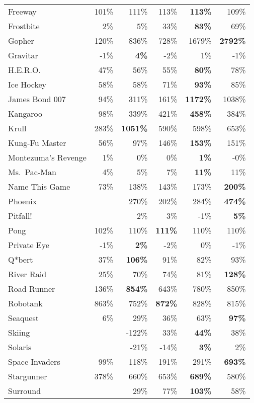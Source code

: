 \documentclass[a4paper]{article}
\begin{document}
\begin{table*}[p]
{{\begin{tabular}{|l|rr|rrr|}
Freeway & 101\% & 111\% & 113\% & \textbf{113\%} & 109\%\\
Frostbite & 2\% & 5\% & 33\% & \textbf{83\%} & 69\%\\
Gopher & 120\% & 836\% & 728\% & 1679\% & \textbf{2792\%}\\
Gravitar & -1\% & \textbf{4\%} & -2\% & 1\% & -1\%\\
H.E.R.O. & 47\% & 56\% & 55\% & \textbf{80\%} & 78\%\\
Ice Hockey & 58\% & 58\% & 71\% & \textbf{93\%} & 85\%\\
James Bond 007 & 94\% & 311\% & 161\% & \textbf{1172\%} & 1038\%\\
Kangaroo & 98\% & 339\% & 421\% & \textbf{458\%} & 384\%\\
Krull & 283\% & \textbf{1051\%} & 590\% & 598\% & 653\%\\
Kung-Fu Master & 56\% & 97\% & 146\% & \textbf{153\%} & 151\%\\
Montezuma's Revenge & 1\% & 0\% & 0\% & \textbf{1\%} & -0\%\\
Ms.\ Pac-Man & 4\% & 5\% & 7\% & \textbf{11\%} & 11\%\\
Name This Game & 73\% & 138\% & 143\% & 173\% & \textbf{200\%}\\
Phoenix &  & 270\% & 202\% & 284\% & \textbf{474\%}\\
Pitfall! &  & 2\% & 3\% & -1\% & \textbf{5\%}\\
Pong & 102\% & 110\% & \textbf{111\%} & 110\% & 110\%\\
Private Eye & -1\% & \textbf{2\%} & -2\% & 0\% & -1\%\\
Q*bert & 37\% & \textbf{106\%} & 91\% & 82\% & 93\%\\
River Raid & 25\% & 70\% & 74\% & 81\% & \textbf{128\%}\\
Road Runner & 136\% & \textbf{854\%} & 643\% & 780\% & 850\%\\
Robotank & 863\% & 752\% & \textbf{872\%} & 828\% & 815\%\\
Seaquest & 6\% & 29\% & 36\% & 63\% & \textbf{97\%}\\
Skiing &  & -122\% & 33\% & \textbf{44\%} & 38\%\\
Solaris &  & -21\% & -14\% & \textbf{3\%} & 2\%\\
Space Invaders & 99\% & 118\% & 191\% & 291\% & \textbf{693\%}\\
Stargunner & 378\% & 660\% & 653\% & \textbf{689\%} & 580\%\\
Surround &  & 29\% & 77\% & \textbf{103\%} & 58\%\\

\end{tabular}}}
\end{table*}
\end{document}
